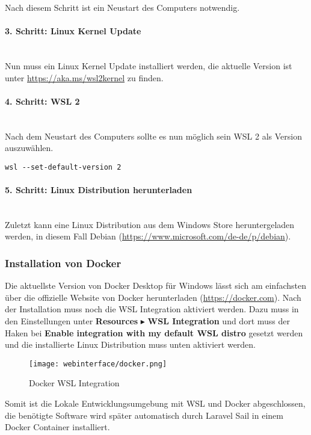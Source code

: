 Nach diesem Schritt ist ein Neustart des Computers notwendig.

\paragraph{3. Schritt: Linux Kernel Update}\mbox{}\\
Nun muss ein Linux Kernel Update installiert werden, die aktuelle Version ist
unter \url{https://aka.ms/wsl2kernel} zu finden.

\paragraph{4. Schritt: WSL 2}\mbox{}\\
Nach dem Neustart des Computers sollte es nun möglich sein WSL 2 als Version
auszuwählen.
\begin{lstlisting}[caption={WSL 2 auswählen}]
  wsl --set-default-version 2
\end{lstlisting}

\paragraph{5. Schritt: Linux Distribution herunterladen}\mbox{}\\
Zuletzt kann eine Linux Distribution aus dem Windows Store heruntergeladen
werden, in diesem Fall Debian (\url{https://www.microsoft.com/de-de/p/debian}).

\subsubsection{Installation von Docker}
Die aktuellste Version von Docker Desktop für Windows lässt sich am einfachsten
über die offizielle Website von Docker herunterladen (\url{https://docker.com}).
Nach der Installation muss noch die WSL Integration aktiviert werden. Dazu muss
in den Einstellungen unter \textbf{Resources} $\blacktriangleright$ \textbf{WSL Integration} und
dort muss der Haken bei \textbf{Enable integration with my default WSL distro} gesetzt
werden und die installierte Linux Distribution muss unten aktiviert werden.

\begin{figure}[H]
  \centering
  \texttt{[image: webinterface/docker.png]}
  \caption{Docker WSL Integration}
\end{figure}

Somit ist die Lokale Entwicklungsumgebung mit WSL und Docker abgeschlossen, die
benötigte Software wird später automatisch durch Laravel Sail in einem Docker
Container installiert.

